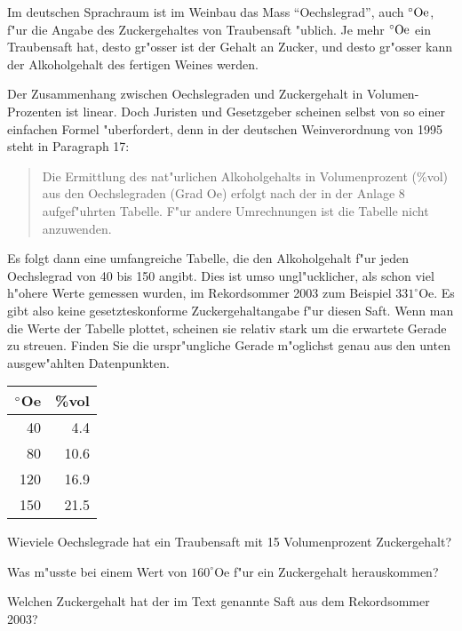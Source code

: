 Im deutschen Sprachraum ist im Weinbau das Mass ``Oechslegrad'', auch
$\mathstrut^\circ\text{Oe}$,
f"ur die
Angabe des Zuckergehaltes von Traubensaft "ublich. Je mehr 
$\mathstrut^\circ\text{Oe}$
ein Traubensaft hat, desto gr"osser ist der Gehalt an Zucker, und desto
gr"osser kann der Alkoholgehalt des fertigen Weines werden.

Der Zusammenhang zwischen Oechslegraden und Zuckergehalt in Volumen-Prozenten
ist linear. Doch Juristen und Gesetzgeber scheinen selbst von so einer einfachen
Formel "uberfordert, denn in der deutschen Weinverordnung von 1995 steht
in Paragraph 17: 
\begin{quote}
Die Ermittlung des nat"urlichen Alkoholgehalts in Volumenprozent (\%vol)
aus den Oechslegraden (Grad Oe) erfolgt nach der in der Anlage 8
aufgef"uhrten Tabelle. F"ur andere Umrechnungen ist die Tabelle nicht
anzuwenden.
\end{quote}
Es folgt dann eine umfangreiche
Tabelle, die den Alkoholgehalt f"ur jeden Oechslegrad von 40 bis
150 angibt. Dies ist umso ungl"ucklicher, als schon viel h"ohere
Werte gemessen wurden, im Rekordsommer 2003 zum Beispiel $331^\circ\text{Oe}$.
Es gibt also keine gesetzteskonforme Zuckergehaltangabe f"ur diesen Saft.
Wenn man die Werte der Tabelle plottet, scheinen
sie relativ stark um die erwartete Gerade zu streuen. Finden Sie die
urspr"ungliche Gerade m"oglichst genau aus den unten ausgew"ahlten
Datenpunkten.
\begin{center}
\begin{tabular}{|r|r|}
\hline
$\mathstrut^\circ$Oe&\%vol\\
\hline
 40& 4.4\\
 80&10.6\\
120&16.9\\
150&21.5\\
\hline
\end{tabular}
\end{center}
\begin{teilaufgaben}
\item
Wieviele Oechslegrade hat ein Traubensaft mit 15 Volumenprozent Zuckergehalt?
\item
Was m"usste bei einem Wert von $160^\circ\text{Oe}$ f"ur ein Zuckergehalt 
herauskommen?
\item 
Welchen Zuckergehalt hat der im Text genannte Saft aus dem Rekordsommer 2003?
\end{teilaufgaben}

